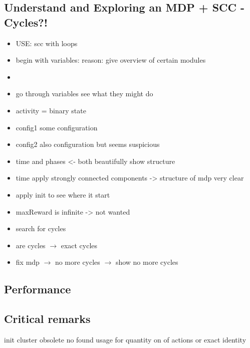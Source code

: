 \documentclass[preview]{standalone}
\begin{document}

\subsection{Understand and Exploring an MDP + SCC - Cycles?!}
\begin{itemize}
	\item USE: scc with loops
	\item begin with variables: reason: give overview of certain modules
	\item {}
	\item go through variables see what they might do
	\item activity = binary state
	\item config1 some configuration
	\item config2 also configuration but seems suspicious
	\item time and phases <- both beautifully show structure
	\item time apply strongly connected components -> structure of mdp very clear
	\item apply init to see where it start
	\item maxReward is infinite -> not wanted
	\item search for cycles
	\item are cycles $\to$ exact cycles 
	\item fix mdp $\to$ no more cycles $\to$ show no more cycles
	
\end{itemize}

\subsection{Performance}

\subsection{Critical remarks}
init cluster obsolete
no found usage for quantity on of actions or exact identity
\end{document}
